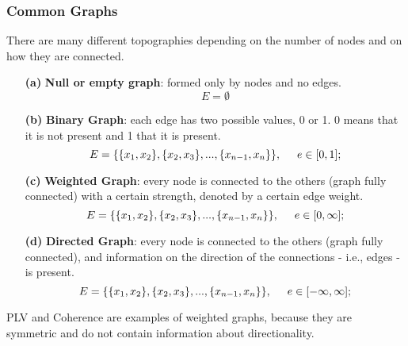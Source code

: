 \subsubsection{Common Graphs}
There are many different topographies depending on the number of nodes and on how they are connected.
\begin{figure}[H]
    \setcounter{subfigure}{0}
    \centering
    \subfigure[]{\texttt{[image: 15\_2]}}
    \subfigure[]{\texttt{[image: 15\_3]}}
    \subfigure[]{\texttt{[image: 15\_4]}}
    \subfigure[]{\texttt{[image: 15\_5]}}
\end{figure}
\begin{itemize}
    \item[\textbf{(a)}] \textbf{Null or empty graph}: formed only by nodes and no edges.
        \begin{equation*}
            E=\emptyset
        \end{equation*}
    \item[\textbf{(b)}] \textbf{Binary Graph}: each edge has two possible values, 0 or 1. 0 means that it is not present and 1 that it is present.
        \begin{equation*}
            E=\{\{x_1, x_2\}, \{x_2,x_3\},..., \{x_{n-1},x_n\}\},\hspace{0.5cm}e\in[0,1];
        \end{equation*}
    \item[\textbf{(c)}] \textbf{Weighted Graph}: every node is connected to the others (graph fully connected) with a certain strength, denoted
        by a certain edge weight.
        \begin{equation*}
            E=\{\{x_1, x_2\}, \{x_2,x_3\},..., \{x_{n-1},x_n\}\},\hspace{0.5cm}e\in[0,\infty];
        \end{equation*}
    \item[\textbf{(d)}] \textbf{Directed Graph}: every node is connected to the others (graph fully connected), and information on the direction of
        the connections - i.e., edges - is present.
        \begin{equation*}
            E=\{\{x_1, x_2\}, \{x_2,x_3\},..., \{x_{n-1},x_n\}\},\hspace{0.5cm}e\in[-\infty,\infty];
        \end{equation*}
\end{itemize}
PLV and Coherence are examples of weighted graphs, because they are symmetric and do not contain information about directionality.

